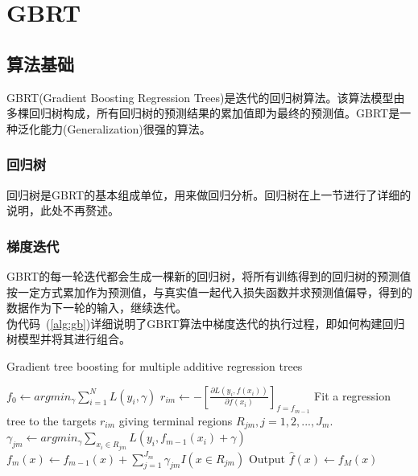 \documentclass[a4paper,11pt,         %
               ]{article}
\begin{document}
\section{GBRT}

\subsection{算法基础}

GBRT(Gradient Boosting Regression Trees)是迭代的回归树算法。该算法模型由多棵回归树构成，所有回归树的预测结果的累加值即为最终的预测值。GBRT是一种泛化能力(Generalization)很强的算法。

\subsubsection{回归树}

回归树是GBRT的基本组成单位，用来做回归分析。回归树在上一节进行了详细的说明，此处不再赘述。


\subsubsection{梯度迭代}

GBRT的每一轮迭代都会生成一棵新的回归树，将所有训练得到的回归树的预测值按一定方式累加作为预测值，与真实值一起代入损失函数并求预测值偏导，得到的数据作为下一轮的输入，继续迭代。 \\

伪代码~(\ref{alg:gb})详细说明了GBRT算法中梯度迭代的执行过程，即如何构建回归树模型并将其进行组合。

\begin{algorithm}
	\caption{Gradient tree boosting for multiple additive regression trees}
	\label{alg:gb}
	\begin{algorithmic}[1] %
	\State $f_{0} \gets argmin_{\gamma} \sum_{i = 1}^{N} L \left ( y_{i}, \gamma\right )$
			\State $r_{im} \gets -\left [ \frac{\partial L\left ( y_{i}, f\left ( x_{i} \right ) \right )}{\partial f\left ( x_{i} \right )} \right ]_{f=f_{m-1}}$			
		\EndFor
		\State Fit a regression tree to the targets $r_{im}$ giving terminal regions $R_{jm}, j = 1,2,...,J_{m}$.
			\State $\gamma_{jm} \gets argmin_{\gamma} \sum_{x_{i} \in R_{jm}} L\left ( y_{i},f_{m-1}\left ( x_{i} \right ) + \gamma \right )$
		\EndFor
		\State $f_{m}\left ( x \right ) \gets f_{m-1}\left ( x \right ) + \sum_{j=1}^{J_{m}} \gamma_{jm}I\left ( x \in R_{jm} \right )$
		\label{alg:gb:update}
	\EndFor
	\State Output $\hat{f}\left ( x \right ) \gets f_{M}\left ( x \right )$
	\end{algorithmic}
\end{algorithm}
\end{document}
